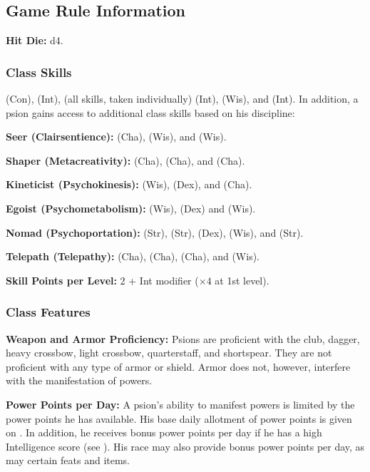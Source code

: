 \subsection{Game Rule Information}

\textbf{Hit Die:} d4.

\subsubsection{Class Skills}

 (Con),  (Int),  (all skills, taken individually) (Int),  (Wis), and  (Int). In addition, a psion gains access to additional class skills based on his discipline:

\textbf{Seer (Clairsentience):}  (Cha),  (Wis), and  (Wis).

\textbf{Shaper (Metacreativity):}  (Cha),  (Cha), and  (Cha).

\textbf{Kineticist (Psychokinesis):}  (Wis),  (Dex), and  (Cha).

\textbf{Egoist (Psychometabolism):}  (Wis),  (Dex) and  (Wis).

\textbf{Nomad (Psychoportation):}  (Str),  (Str),  (Dex),  (Wis), and  (Str).

\textbf{Telepath (Telepathy):}  (Cha),  (Cha),  (Cha), and  (Wis).

\textbf{Skill Points per Level:} 2 + Int modifier ($\times 4$ at 1st level).

\subsubsection{Class Features}

\textbf{Weapon and Armor Proficiency:} Psions are proficient with the club, dagger, heavy crossbow, light crossbow, quarterstaff, and shortspear. They are not proficient with any type of armor or shield. Armor does not, however, interfere with the manifestation of powers.

\textbf{Power Points per Day:} A psion's ability to manifest powers is limited by the power points he has available. His base daily allotment of power points is given on . In addition, he receives bonus power points per day if he has a high Intelligence score (see ). His race may also provide bonus power points per  day, as may certain feats and items.

